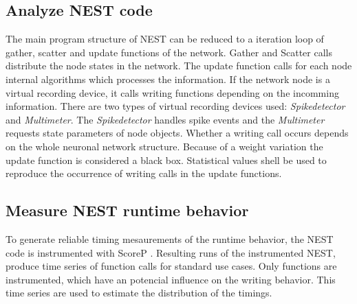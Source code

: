 \documentclass[]{YIC2015}
\begin{document}
\subsection{Analyze NEST code}
The main program structure of NEST can be reduced to a iteration loop of gather, scatter and update functions of the network.
Gather and Scatter calls distribute the node states in the network.
The update function calls for each node internal algorithms which processes the information.
If the network node is a virtual recording device,
it calls writing functions depending on the incomming information.
There are two types of  virtual recording devices used: \emph{Spikedetector} and \emph{Multimeter}.
The \emph{Spikedetector} handles spike events and
the \emph{Multimeter} requests state parameters of node objects.
Whether a writing call occurs depends on the whole neuronal network structure.
Because of a weight variation the update function is considered a black box.
Statistical values shell be used to reproduce the occurrence of writing calls in the update functions.

\subsection{Measure NEST runtime behavior}
To generate reliable timing mesaurements of the runtime behavior,
the NEST code is instrumented with ScoreP \cite{scoreP}.
Resulting runs of the instrumented NEST,
produce time series of function calls for standard use cases.
Only functions are instrumented, which have an potencial influence on the writing behavior.
This time series are used to estimate the distribution of the timings.
\end{document}
